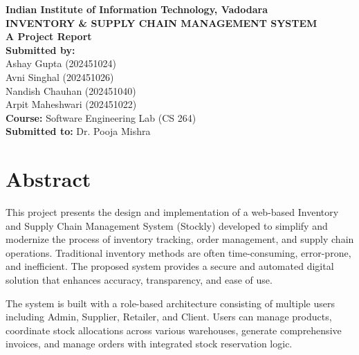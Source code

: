 \documentclass[12pt,a4paper]{report}
\begin{document}
\begin{titlepage}
\begin{center}
    \vspace*{1.5cm}
    
    {\fontsize{20}{24}\selectfont \textbf{Indian Institute of Information Technology, Vadodara}}\\[2cm]
    
    {\fontsize{24}{28}\selectfont \textbf{INVENTORY \& SUPPLY CHAIN MANAGEMENT SYSTEM}}\\[2cm]
    
    {\Large \textbf{A Project Report}}\\[3cm]
    
    {\large \textbf{Submitted by:}}\\[0.5cm]
    {\large Ashay Gupta (202451024)}\\[0.2cm]
    {\large Avni Singhal (202451026)}\\[0.2cm]
    {\large Nandish Chauhan (202451040)}\\[0.2cm]
    {\large Arpit Maheshwari (202451022)}\\[3cm]
    
    {\large \textbf{Course: }Software Engineering Lab (CS 264)}\\[0.5cm]
    
    {\large \textbf{Submitted to: }Dr. Pooja Mishra}\\[2cm]
    
\end{center}
\end{titlepage}


\chapter*{Abstract}
This project presents the design and implementation of a web-based Inventory and Supply Chain Management System (Stockly) developed to simplify and modernize the process of inventory tracking, order management, and supply chain operations. Traditional inventory methods are often time-consuming, error-prone, and inefficient. The proposed system provides a secure and automated digital solution that enhances accuracy, transparency, and ease of use.

The system is built with a role-based architecture consisting of multiple users including Admin, Supplier, Retailer, and Client. Users can manage products, coordinate stock allocations across various warehouses, generate comprehensive invoices, and manage orders with integrated stock reservation logic. 
\end{document}
